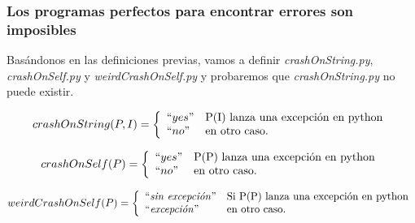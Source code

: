 \documentclass[xcolor=table]{beamer}
\begin{document}
\begin{frame} [fragile] \frametitle{Los programas perfectos para encontrar errores son imposibles}  \small  

Basándonos en las definiciones previas, vamos a definir \textit{crashOnString.py}, \textit{crashOnSelf.py} y  \textit{weirdCrashOnSelf.py} y probaremos que \textit{crashOnString.py} no puede existir. 


\begin{dmath}
     \label{eq:crashOnString}
     crashOnString(P, I) =  \left\{
	       \begin{array}{ll}
		 ``yes"      & \text{P(I) lanza una excepción en python} \\
		 ``no"     & \text{en otro caso.} \\
	       \end{array}
	     \right.
 \end{dmath}

\begin{dmath}
     \label{eq:crashOnSelf}
     crashOnSelf(P) =  \left\{
	       \begin{array}{ll}
		 ``yes"      & \text{P(P) lanza una excepción en python} \\
	``no"     & \text{en otro caso.} \\
	       \end{array}
	     \right.
 \end{dmath}

 \begin{dmath}
     \label{eq:weirdCrashOnSelf}
     weirdCrashOnSelf(P) =  \left\{
	       \begin{array}{ll}
		 ``\text{\textit{sin excepción}}"      &  \text{Si P(P) lanza una excepción en python} \\
	     ``\text{\textit{excepción}}"                    & \text{en otro caso.} \\
	       \end{array}
	     \right.
 \end{dmath}
\end{frame} 
\end{document}
